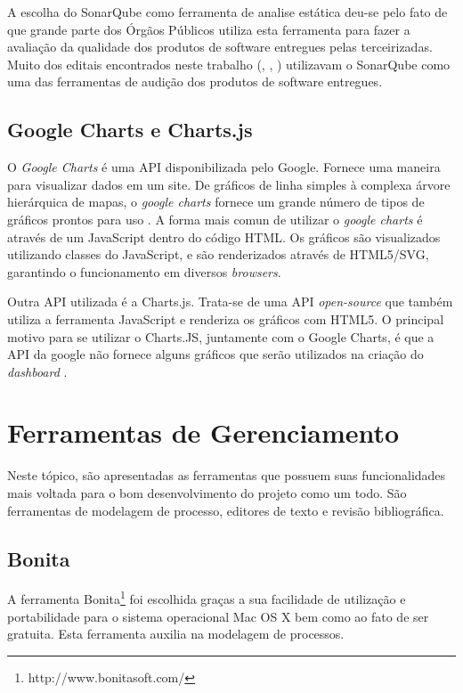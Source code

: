 A escolha do SonarQube como ferramenta de analise estática deu-se pelo fato de que grande parte dos Órgãos Públicos utiliza esta ferramenta para fazer a avaliação da qualidade dos produtos de software entregues pelas terceirizadas. Muito dos editais encontrados neste trabalho (\cite{tiossi_junior_adesao_2010}, \cite{fernandes_licitacao_2005}, \cite{edital})  utilizavam o SonarQube como uma das ferramentas de audição dos produtos de software entregues.
	
	\subsection{Google Charts e Charts.js}
	\label{sub:google_charts_chartsjs}
	O \textit{Google Charts} é uma API disponibilizada pelo Google. Fornece uma maneira para visualizar dados em um site. De gráficos de linha simples à complexa árvore hierárquica de mapas, o \textit{google charts} fornece um grande número de tipos de gráficos prontos para uso \cite{google_charts}. A forma mais comun de utilizar o \textit{google charts} é através de um JavaScript dentro do código HTML. Os gráficos são visualizados utilizando classes do JavaScript, e são renderizados através de HTML5/SVG, garantindo o funcionamento em diversos \textit{browsers}. 

Outra API utilizada é a Charts.js. Trata-se de uma API \textit{open-source} que também utiliza a ferramenta JavaScript e renderiza os gráficos com HTML5. O principal motivo para se utilizar o Charts.JS, juntamente com o Google Charts, é que a API da google não fornece alguns gráficos que serão utilizados na criação do \textit{dashboard} \cite{chartsjs}.
	
\section{Ferramentas de Gerenciamento}
Neste tópico, são apresentadas as ferramentas que possuem suas funcionalidades mais voltada para o bom desenvolvimento do projeto como um todo. São ferramentas de modelagem de processo, editores de texto e revisão bibliográfica. 

	\subsection{Bonita} %
	\label{sub:Bonita}
		 A ferramenta Bonita\footnote{http://www.bonitasoft.com/} foi escolhida graças a sua facilidade de utilização e portabilidade para o sistema operacional Mac OS X bem como ao fato de ser gratuita. Esta ferramenta auxilia na modelagem de processos.

